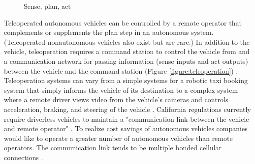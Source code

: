 \documentclass{article}
\begin{document}
\begin{figure}[h] \centering
{}
    \caption{Sense, plan, act \citep{brooks_robust_1986}}
\label{figure:brooks_robust_1986}
\end{figure}

Teleoperated autonomous vehicles can be controlled by a remote operator that complements or supplements the plan step in an autonomous system. (Teleoperated nonautonomous vehicles also exist but are rare.) In addition to the vehicle, teleoperation requires a command station to control the vehicle from and a communication network for passing information (sense inputs and act outputs) between the vehicle and the command station (Figure \ref{figure:teleoperation}) \citep{tiwari_vehicle_2018}. Teleoperation systems can vary from a simple systems for a robotic taxi booking system that simply informs the vehicle of its destination to a complex system where a remote driver views video from the vehicle's cameras and controls acceleration, braking, and steering of the vehicle \citep{nissan_motor_corporation_press_2017, levinson_teleoperation_2016, okumura_remote_2016, fairfield_remote_2016, rust_expert_2017}. California regulations currently require driverless vehicles to maintain a "communication link between the vehicle and remote operator" \citep{department_of_motor_vehicles_driverless_2018}. To realize cost savings of autonomous vehicles companies would like to operate a greater number of autonomous vehicles than remote operators. The communication link tends to be multiple bonded cellular connections \citep{korosec_82_nodate, korosec_98_nodate}.
\end{document}
